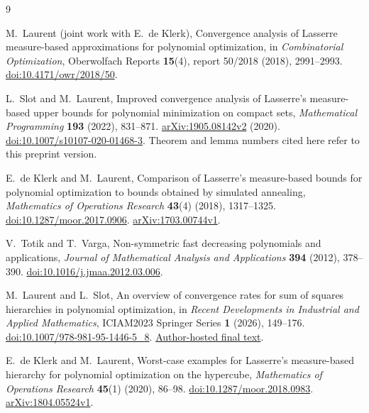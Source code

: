 \documentclass[11pt]{article}
\begin{document}
\begin{thebibliography}{9}

M.~Laurent (joint work with E.~de Klerk),
Convergence analysis of Lasserre measure-based approximations for
polynomial optimization,
in \emph{Combinatorial Optimization}, Oberwolfach Reports
\textbf{15}(4), report 50/2018 (2018), 2991--2993.
\href{https://doi.org/10.4171/owr/2018/50}{doi:10.4171/owr/2018/50}.

L.~Slot and M.~Laurent,
Improved convergence analysis of Lasserre's measure-based upper
bounds for polynomial minimization on compact sets,
\emph{Mathematical Programming} \textbf{193} (2022), 831--871.
\href{https://arxiv.org/abs/1905.08142v2}{arXiv:1905.08142v2} (2020).
\href{https://doi.org/10.1007/s10107-020-01468-3}{doi:10.1007/s10107-020-01468-3}.
Theorem and lemma numbers cited here refer to this preprint version.

E.~de Klerk and M.~Laurent,
Comparison of Lasserre's measure-based bounds for polynomial
optimization to bounds obtained by simulated annealing,
\emph{Mathematics of Operations Research} \textbf{43}(4) (2018),
1317--1325.
\href{https://doi.org/10.1287/moor.2017.0906}{doi:10.1287/moor.2017.0906}.
\href{https://arxiv.org/abs/1703.00744v1}{arXiv:1703.00744v1}.

V.~Totik and T.~Varga,
Non-symmetric fast decreasing polynomials and applications,
\emph{Journal of Mathematical Analysis and Applications}
\textbf{394} (2012), 378--390.
\href{https://doi.org/10.1016/j.jmaa.2012.03.006}{doi:10.1016/j.jmaa.2012.03.006}.

M.~Laurent and L.~Slot,
An overview of convergence rates for sum of squares hierarchies in
polynomial optimization,
in \emph{Recent Developments in Industrial and Applied Mathematics},
ICIAM2023 Springer Series \textbf{1} (2026), 149--176.
\href{https://doi.org/10.1007/978-981-95-1446-5_8}{doi:10.1007/978-981-95-1446-5\_8}.
\href{https://ir.cwi.nl/pub/36052/36052.pdf}{Author-hosted final text}.

E.~de Klerk and M.~Laurent,
Worst-case examples for Lasserre's measure-based hierarchy for
polynomial optimization on the hypercube,
\emph{Mathematics of Operations Research} \textbf{45}(1) (2020), 86--98.
\href{https://doi.org/10.1287/moor.2018.0983}{doi:10.1287/moor.2018.0983}.
\href{https://arxiv.org/abs/1804.05524v1}{arXiv:1804.05524v1}.

\end{thebibliography}
\end{document}
